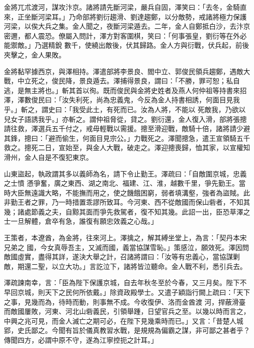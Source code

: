 \begin{pinyinscope}
 金將兀朮渡河，謀攻汴京。諸將請先斷河梁，嚴兵自固，澤笑曰：「去冬，金騎直來，正坐斷河梁耳。」乃命部將劉衍趨滑、劉達趨鄭，以分敵勢，戒諸將極力保護河梁，以俟大兵之集。金人聞之，夜斷河梁遁去。二年，金人自鄭抵白沙，去汴京密邇，都人震恐。僚屬入問計，澤方對客圍棋，笑曰：「何事張皇，劉衍等在外必能禦敵。」乃選精銳
 數千，使繞出敵後，伏其歸路。金人方與衍戰，伏兵起，前後夾擊之，金人果敗。



 金將黏罕據西京，與澤相持。澤遣部將李景良、閻中立、郭俊民領兵趨鄭，遇敵大戰，中立死之，俊民降，景良遁去。澤捕得景良，謂曰：「不勝，罪可恕；私自逃，是無主將也。」斬其首以徇。既而俊民與金將史姓者及燕人何仲祖等持書來招澤，澤數俊民曰：「汝失利死，尚為忠義鬼，今反為金人持書相誘，何面目見我乎。」斬之，謂史曰：「我受此土，有死而已。汝為人將，不能以
 死敵我，乃欲以兒女子語誘我乎。」亦斬之。謂仲祖脅從，貸之。劉衍還，金人復入滑，部將張摠請往救，澤選兵五千付之，戒毋輕戰以需援。摠至滑迎戰，敵騎十倍，諸將請少避其鋒，摠曰：「避而偷生，何面目見宗公。」力戰死之。澤聞摠急，遣王宣領騎五千救之。摠死二日，宣始至，與金人大戰，破走之。澤迎摠喪歸，恤其家，以宣權知滑州，金人自是不復犯東京。



 山東盜起，執政謂其多以義師為名，請下令止勤王。澤疏曰：「自敵圍京城，忠義之士憤
 懣爭奮，廣之東西、湖之南北、福建、江、淮，越數千里，爭先勤王。當時大臣無遠識大略，不能撫而用之，使之饑餓困窮，弱者填溝壑，強者為盜賊。此非勤王者之罪，乃一時措置乖謬所致耳。今河東、西不從敵國而保山砦者，不知其幾；諸處節義之夫，自黥其面而爭先救駕者，復不知其幾。此詔一出，臣恐草澤之士一旦解體，倉卒有急，誰復有願忠效義之心哉。」



 王策者，本遼酋，為金將，往來河上。澤擒之，解其縛坐堂上，為言：「契丹本宋兄弟之
 國，今女真辱吾主，又滅而國，義當協謀雪恥。」策感泣，願效死。澤因問敵國虛實，盡得其詳，遂決大舉之計，召諸將謂曰：「汝等有忠義心，當協謀剿敵，期還二聖，以立大功。」言訖泣下，諸將皆泣聽命。金人戰不利，悉引兵去。



 澤疏諫南幸，言：「臣為陛下保護京城，自去年秋冬至於今春，又三月矣。陛下不早回京城，則天下之民何所依戴。」除資政殿學士。又遣子穎詣行闕上疏曰：「天下之事，見幾而為，待時而動，則事無不成。今收復伊、洛而金酋渡
 河，捍蔽滑臺而敵國屢敗，河東、河北山砦義民，引領舉踵，日望官兵之至。以幾以時而言之，中興之兆可見，而金人滅亡之期可必，在陛下見幾乘時而已。」又言：「昔楚人城郢，史氏鄙之。今聞有旨於儀真教習水戰，是規規為偏霸之謀，非可鄙之甚者乎？傳聞四方，必謂中原不守，遂為江寧控扼之計耳。」




\end{pinyinscope}
